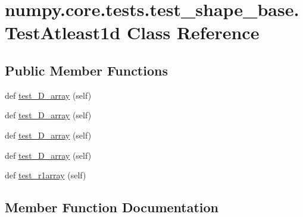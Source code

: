 \hypertarget{classnumpy_1_1core_1_1tests_1_1test__shape__base_1_1TestAtleast1d}{}\section{numpy.\+core.\+tests.\+test\+\_\+shape\+\_\+base.\+Test\+Atleast1d Class Reference}
\label{classnumpy_1_1core_1_1tests_1_1test__shape__base_1_1TestAtleast1d}
\subsection*{Public Member Functions}
\begin{DoxyCompactItemize}
\item 
def \hyperlink{classnumpy_1_1core_1_1tests_1_1test__shape__base_1_1TestAtleast1d_a9a05669ddfb94fcc38653996811e0e11}{test\+\_\+D\+\_\+array} (self)
\item 
def \hyperlink{classnumpy_1_1core_1_1tests_1_1test__shape__base_1_1TestAtleast1d_a7ee59c2d33775b7a4831e9621359dfa6}{test\+\_\+D\+\_\+array} (self)
\item 
def \hyperlink{classnumpy_1_1core_1_1tests_1_1test__shape__base_1_1TestAtleast1d_a5f98df2f0f50b15b0b6e8752b9c8e1e8}{test\+\_\+D\+\_\+array} (self)
\item 
def \hyperlink{classnumpy_1_1core_1_1tests_1_1test__shape__base_1_1TestAtleast1d_a25c15ce4fb0f58cdbc5d00b73ad85ab4}{test\+\_\+D\+\_\+array} (self)
\item 
def \hyperlink{classnumpy_1_1core_1_1tests_1_1test__shape__base_1_1TestAtleast1d_ac9f95f30eff2b7a6a85a4efaebbb0a44}{test\+\_\+r1array} (self)
\end{DoxyCompactItemize}


\subsection{Member Function Documentation}
\mbox{\label{classnumpy_1_1core_1_1tests_1_1test__shape__base_1_1TestAtleast1d_a9a05669ddfb94fcc38653996811e0e11}} 
